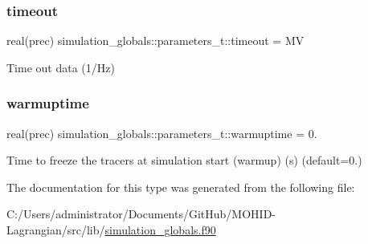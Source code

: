 \subsubsection{\texorpdfstring{timeout}{timeout}}
{\footnotesize\ttfamily real(prec) simulation\+\_\+globals\+::parameters\+\_\+t\+::timeout = MV\hspace{0.3cm}{\ttfamily [private]}}



Time out data (1/\+Hz) 

\mbox{\label{structsimulation__globals_1_1parameters__t_ad187b9779c3a5c156824c359eef4c52e}} 
\subsubsection{\texorpdfstring{warmuptime}{warmuptime}}
{\footnotesize\ttfamily real(prec) simulation\+\_\+globals\+::parameters\+\_\+t\+::warmuptime = 0.\hspace{0.3cm}{\ttfamily [private]}}



Time to freeze the tracers at simulation start (warmup) (s) (default=0.) 



The documentation for this type was generated from the following file\+:\begin{DoxyCompactItemize}
\item 
C\+:/\+Users/administrator/\+Documents/\+Git\+Hub/\+M\+O\+H\+I\+D-\/\+Lagrangian/src/lib/\mbox{\hyperlink{simulation__globals_8f90}{simulation\+\_\+globals.\+f90}}\end{DoxyCompactItemize}
